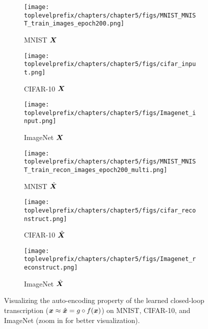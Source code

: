 \documentclass[../../book-main.tex]{subfiles}
\begin{document}
\begin{figure}[t]
    \begin{subfigure}[t]{0.3\textwidth}
        \centering
        \texttt{[image: \\toplevelprefix/chapters/chapter5/figs/MNIST\_MNIST\_train\_images\_epoch200.png]}
        \caption{{\small MNIST $\bm{X}$}}
    \end{subfigure}
    \hfill
    \begin{subfigure}[t]{0.3\textwidth}
        \centering
        \texttt{[image: \\toplevelprefix/chapters/chapter5/figs/cifar\_input.png]}
        \caption{{\small CIFAR-10 $\bm{X}$}}
    \end{subfigure}
    \hfill
    \begin{subfigure}[t]{0.3\textwidth}
        \centering
        \texttt{[image: \\toplevelprefix/chapters/chapter5/figs/Imagenet\_input.png]}
        \caption{{\small ImageNet $\bm{X}$}}
    \end{subfigure}

    \begin{subfigure}[t]{0.3\textwidth}
        \centering
        \texttt{[image: \\toplevelprefix/chapters/chapter5/figs/MNIST\_MNIST\_train\_recon\_images\_epoch200\_multi.png]}
        \caption{{\small MNIST $\hat{\bm{X}}$}}
    \end{subfigure}
    \hfill
    \begin{subfigure}[t]{0.3\textwidth}
        \centering
        \texttt{[image: \\toplevelprefix/chapters/chapter5/figs/cifar\_reconstruct.png]}
        \caption{{\small CIFAR-10 $\hat{\bm{X}}$}}
    \end{subfigure}
    \hfill
    \begin{subfigure}[t]{0.3\textwidth}
        \centering
        \texttt{[image: \\toplevelprefix/chapters/chapter5/figs/Imagenet\_reconstruct.png]}
        \caption{{\small ImageNet $\hat{\bm{X}}$}}
    \end{subfigure}
    \caption{Visualizing the auto-encoding property of the learned closed-loop transcription \mbox{($\bm{x} \approx \hat{\bm{x}} = g\circ f(\bm{x})$)} on MNIST, CIFAR-10, and ImageNet (zoom in for better visualization).}
    \label{fig:justify_xhat_equals_x}
\end{figure}
     
\end{document}
